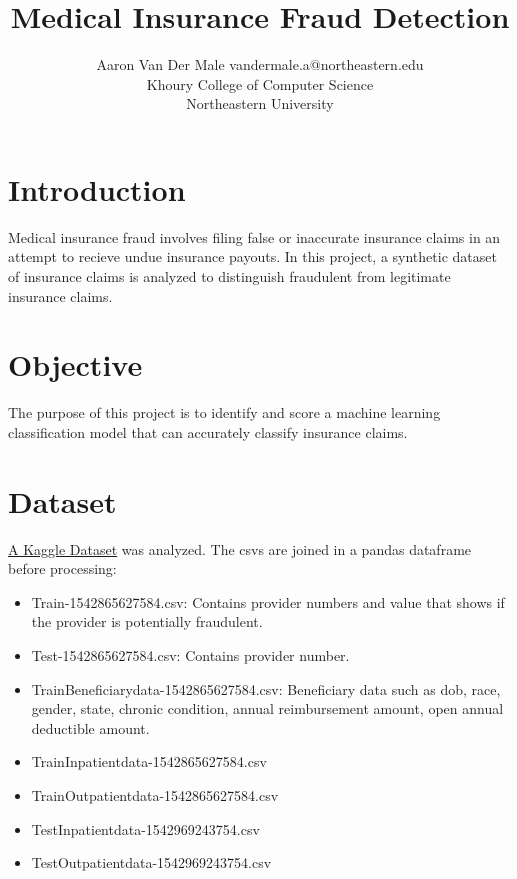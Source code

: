 \documentclass[twoside,11pt]{article}
\begin{document}
\title{Medical Insurance Fraud Detection}

\author{\name Aaron Van Der Male \email vandermale.a@northeastern.edu \\
       \addr Khoury College of Computer Science\\
       Northeastern University\\
       }


\maketitle


\section{Introduction}
Medical insurance fraud involves filing false or inaccurate insurance claims in an attempt to recieve undue insurance payouts.
In this project, a synthetic dataset of insurance claims is analyzed to distinguish fraudulent from legitimate insurance claims.
\\
\section{Objective}
The purpose of this project is to identify and score a machine learning classification model that can accurately classify insurance claims.
\section{Dataset}
 \href{htps://www.kaggle.com/datasets/beenusharma42/fraudlent-claim-in-healthcare}{A Kaggle Dataset}
 was analyzed. The csvs are joined in a pandas dataframe before processing:
 \begin{itemize}
    \item Train-1542865627584.csv: Contains provider numbers and value that shows if the provider is potentially fraudulent.
    \item Test-1542865627584.csv: Contains provider number.
    \item TrainBeneficiarydata-1542865627584.csv: Beneficiary data such as dob, race, gender, state, chronic condition, annual reimbursement amount, open annual deductible amount.
    \item TrainInpatientdata-1542865627584.csv
    \item TrainOutpatientdata-1542865627584.csv
    \item TestInpatientdata-1542969243754.csv
    \item TestOutpatientdata-1542969243754.csv
  \end{itemize}
\newpage
\end{document}
